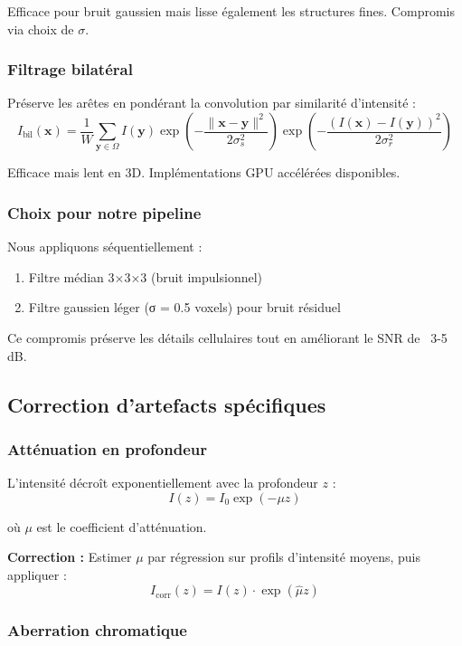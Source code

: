 Efficace pour bruit gaussien mais lisse également les structures fines. Compromis via choix de $\sigma$.

\subsubsection{Filtrage bilatéral}

Préserve les arêtes en pondérant la convolution par similarité d'intensité :
\[
I_{\text{bil}}(\mathbf{x}) = \frac{1}{W}\sum_{\mathbf{y} \in \Omega} I(\mathbf{y}) \exp\left(-\frac{\|\mathbf{x}-\mathbf{y}\|^2}{2\sigma_s^2}\right) \exp\left(-\frac{(I(\mathbf{x})-I(\mathbf{y}))^2}{2\sigma_r^2}\right)
\]

Efficace mais lent en 3D. Implémentations GPU accélérées disponibles.

\subsubsection{Choix pour notre pipeline}

Nous appliquons séquentiellement :
\begin{enumerate}
    \item Filtre médian 3×3×3 (bruit impulsionnel)
    \item Filtre gaussien léger (σ = 0.5 voxels) pour bruit résiduel
\end{enumerate}

Ce compromis préserve les détails cellulaires tout en améliorant le SNR de ~3-5 dB.

\subsection{Correction d'artefacts spécifiques}

\subsubsection{Atténuation en profondeur}

L'intensité décroît exponentiellement avec la profondeur $z$ :
\[
I(z) = I_0 \exp(-\mu z)
\]

où $\mu$ est le coefficient d'atténuation.

\textbf{Correction :}
Estimer $\mu$ par régression sur profils d'intensité moyens, puis appliquer :
\[
I_{\text{corr}}(z) = I(z) \cdot \exp(\hat{\mu} z)
\]

\subsubsection{Aberration chromatique}

